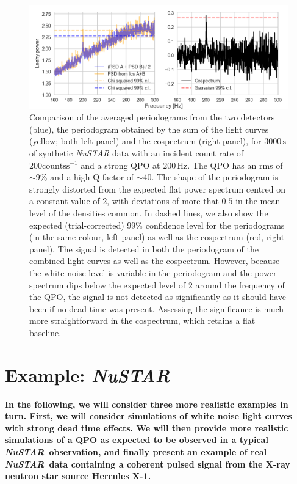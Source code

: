 \documentclass[12pt]{emulateapj}
\newcommand{\project}[1]{\textsl{#1}}
\newcommand{\nustar}{\project{NuSTAR}\xspace}
\begin{document}
\begin{figure}
\begin{center}
\includegraphics[width=\textwidth]{qpo.png}
\caption{Comparison of the averaged periodograms from the two detectors (blue), the periodogram obtained by the sum of the light curves (yellow; both left panel) and the cospectrum (right panel), for $3000\,\mathrm{s}$ of synthetic \nustar data with an incident count rate of $200 \mathrm{counts}\mathrm{s}^{-1}$ and a strong QPO at $200\,\mathrm{Hz}$. 
The QPO has an rms of $\sim$9\% and a high Q factor of $\sim$40. The shape of the periodogram is strongly distorted from the expected flat power spectrum centred on a constant value of $2$, with deviations of more that $0.5$ in the mean level of the densities common. In dashed lines, we also show the expected (trial-corrected) $99\%$ confidence level for the periodograms (in the same colour, left panel) as well as the cospectrum (red, right panel). The signal is detected in both the periodogram of the combined light curves as well as the cospectrum. However, because the white noise level is variable in the periodogram and the power spectrum dips below the expected level of $2$ around the frequency of the QPO, the signal is not detected as significantly as it should have been if no dead time was present. Assessing the significance is much more straightforward in the cospectrum, which retains a flat baseline.
}
\label{fig:qpo}
\end{center}
\end{figure}


\section{Example: \nustar}
\label{sec:nustarqpo}

\textbf{In the following, we will consider three more realistic examples in turn. First, we will consider simulations of white noise light curves with strong dead time effects. We will then provide more realistic simulations of a QPO as expected to be observed in a typical \nustar\ observation, and finally present an example of real \nustar\ data containing a coherent pulsed signal from the X-ray neutron star source Hercules X-1.}
\end{document}
